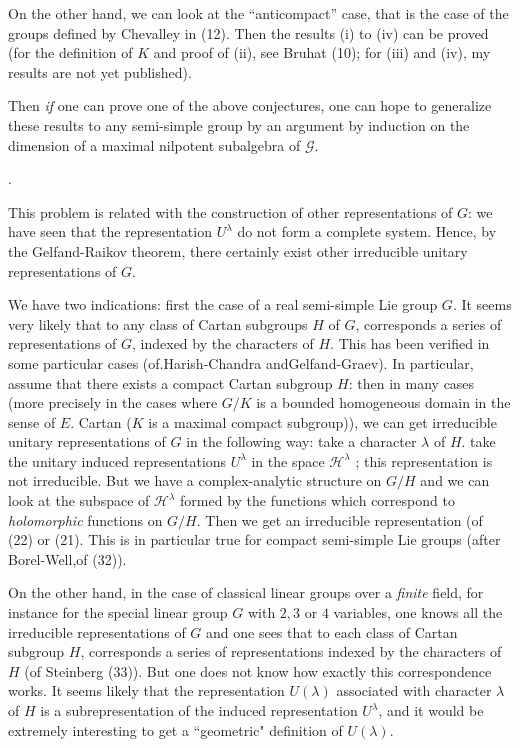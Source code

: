   On the other hand, we can look at the ``anticompact'' case, that is the
  case of the groups defined by Chevalley in (12). Then the results (i)
  to (iv) can be proved (for the definition of $K$ and proof of (ii),
  see Bruhat (10); for (iii) and (iv), my results are not yet
  published). 
  
  Then \textit{if} one can prove one of the above conjectures, one can
  hope to generalize these results to any semi-simple group by an
  argument by induction on the dimension of a maximal nilpotent
  subalgebra of $\mathscr{G}$. 
  
 . 

  This problem is related with the construction of other
  representations of $G$: we have seen that the representation
  $U^\lambda$ do not form a complete system. Hence, by the
  Gelfand-Raikov theorem, there certainly exist other irreducible
  unitary representations of $G$. 

  We have two indications: first the case of a real semi-simple Lie
  group $G$. It seems very likely that to any class of Cartan subgroups
  $H$ of $G$, corresponds a series of representations of $G$, indexed by
  the characters of $H$. This has been verified in some particular cases
  (of.Harish-Chandra and\pageoriginale Gelfand-Graev). In particular, assume that
  there exists a compact Cartan subgroup $H$: then in many cases (more
  precisely in the cases where $G/K$ is a bounded homogeneous domain in
  the sense of $E$. Cartan ($K$ is a maximal compact subgroup)), we can
  get irreducible unitary representations of $G$ in the following way:
  take a character $\lambda$ of $H$. take the unitary induced
  representations $U^\lambda$ in the space $\mathscr{H}^\lambda$ ; this
  representation is not irreducible. But we have a complex-analytic
  structure on $G/H$ and we can look at the subspace of
  $\mathscr{H}^\lambda$ formed by the functions which correspond to
  \textit{holomorphic} functions on $G/H$. Then we get an irreducible
  representation (of (22) or (21). This is in particular true for
  compact semi-simple Lie groups (after Borel-Well,of (32)). 
  
  On the other hand, in the case of classical linear groups over a
  \textit{finite} field, for instance for the special linear group $G$
  with $2,3$ or $4$ variables, one knows all the irreducible
  representations of $G$ and one sees that to each class of Cartan
  subgroup $H$, corresponds a series of representations indexed by the
  characters of $H$ (of Steinberg (33)). But one does not know how
  exactly this correspondence works. It seems likely that the
  representation $U(\lambda)$ associated with character $\lambda$ of $H$
  is a subrepresentation of the induced representation $U^\lambda$, and
  it would be extremely interesting to get a ``geometric" definition of
  $U(\lambda)$. 
  
